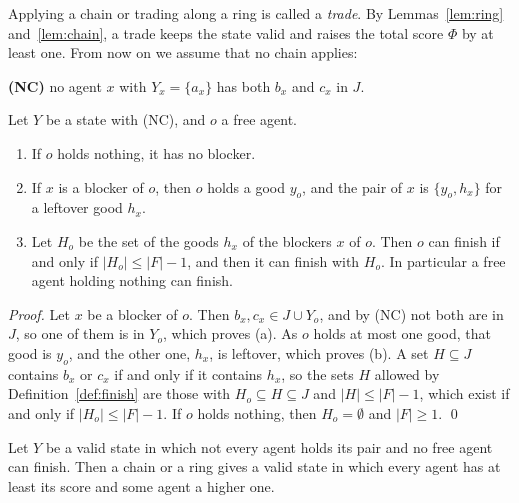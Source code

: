 \documentclass[runningheads,11pt]{llncs}
\begin{document}
\noindent Applying a chain or trading along a ring is called a \emph{trade}. By Lemmas~\ref{lem:ring} and~\ref{lem:chain}, a trade keeps the state valid and raises the total score $\Phi$ by at least one. From now on we assume that no chain applies:

\smallskip
\noindent\textbf{(NC)} no agent $x$ with $Y_x=\{a_x\}$ has both $b_x$ and $c_x$ in $J$.
\smallskip

\begin{lemma}\label{lem:test}
Let $Y$ be a state with (NC), and $o$ a free agent.
\begin{enumerate}
\item[(a)] If $o$ holds nothing, it has no blocker.
\item[(b)] If $x$ is a blocker of $o$, then $o$ holds a good $y_o$, and the pair of $x$ is $\{y_o,h_x\}$ for a leftover good $h_x$.
\item[(c)] Let $H_o$ be the set of the goods $h_x$ of the blockers $x$ of $o$. Then $o$ can finish if and only if $|H_o|\le|F|-1$, and then it can finish with $H_o$. In particular a free agent holding nothing can finish.
\end{enumerate}
\end{lemma}

\begin{proof}
Let $x$ be a blocker of $o$. Then $b_x,c_x\in J\cup Y_o$, and by (NC) not both are in $J$, so one of them is in $Y_o$, which proves (a). As $o$ holds at most one good, that good is $y_o$, and the other one, $h_x$, is leftover, which proves (b). A set $H\subseteq J$ contains $b_x$ or $c_x$ if and only if it contains $h_x$, so the sets $H$ allowed by Definition~\ref{def:finish} are those with $H_o\subseteq H\subseteq J$ and $|H|\le|F|-1$, which exist if and only if $|H_o|\le|F|-1$. If $o$ holds nothing, then $H_o=\emptyset$ and $|F|\ge1$. \qed
\end{proof}

\begin{theorem}\label{thm:improve}
Let $Y$ be a valid state in which not every agent holds its pair and no free agent can finish. Then a chain or a ring gives a valid state in which every agent has at least its score and some agent a higher one.
\end{theorem}
\end{document}
